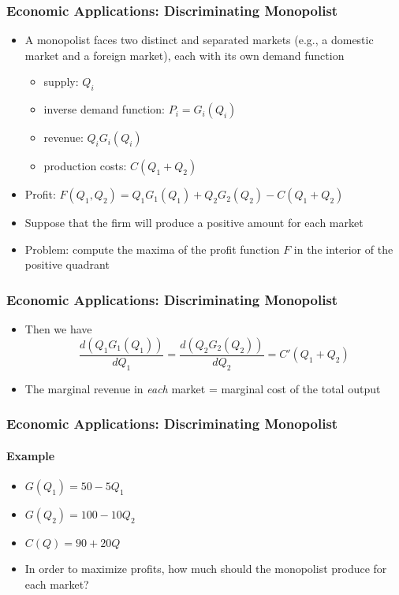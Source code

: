\documentclass[9pt,aspectratio=169]{beamer}
\begin{document}
\begin{frame}
	\frametitle{Economic Applications: Discriminating Monopolist}
	\begin{itemize}
		\item A monopolist faces two distinct and separated markets (e.g., a
        domestic market and a foreign market), each with its own demand
        function
        \begin{itemize}
            \item supply: $Q_i$
            \item inverse demand function: $P_i = G_i(Q_i)$
            \item revenue: $Q_iG_i(Q_i)$
            \item production costs: $C(Q_1+Q_2)$
        \end{itemize}
		\item Profit: $F(Q_1,Q_2) = Q_1G_1(Q_1)+Q_2G_2(Q_2)-C(Q_1+Q_2)$
        \item Suppose that the firm will produce a positive amount for each
        market
		\item Problem: compute the maxima of the profit function $F$ in the
        interior of the positive quadrant
	\end{itemize}
\end{frame}


\begin{frame}
	\frametitle{Economic Applications: Discriminating Monopolist}
	\begin{itemize}
		\item Then we have
        $$\frac{d(Q_1G_1(Q_1))}{dQ_1} = \frac{d(Q_2G_2(Q_2))}{dQ_2} =
        C'(Q_1+Q_2)$$
		\item The marginal revenue in \emph{each} market = marginal cost of
        the total output
	\end{itemize}
\end{frame}


\begin{frame}
    \frametitle{Economic Applications: Discriminating Monopolist}
    \framesubtitle{Example}
    \begin{itemize}
        \item $G(Q_1) = 50 - 5Q_1$
        \item $G(Q_2) = 100 - 10Q_2$
        \item $C(Q) = 90 + 20Q$
        \item In order to maximize profits, how much should the monopolist
        produce for each market?
    \end{itemize}
\end{frame}
\end{document}
